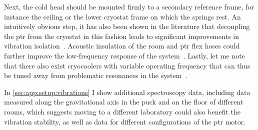 Next, the cold head should be mounted firmly to a secondary reference frame, for instance the ceiling or the lower cryostat frame on which the springs rest.
An intuitively obvious step, it has also been shown in the literature that decoupling the \gls{ptr} from the cryostat in this fashion leads to significant improvements in vibration isolation~\cite{Olivieri2017}.
Acoustic insulation of the room and \gls{ptr} flex hoses could further improve the low-frequency response of the system~\cite{Schmoranzer2019,Oh2021}.
Lastly, let me note that there also exist cryocoolers with variable operating frequency that can thus be tuned away from problematic resonances in the system~\cite{TransMitPTR}.

In \cref{sec:app:setup:vibrations} I show additional spectroscopy data, including data measured along the gravitational axis in the puck and on the floor of different rooms, which suggests moving to a different laboratory could also benefit the vibration stability, as well as data for different configurations of the \gls{ptr} motor.
